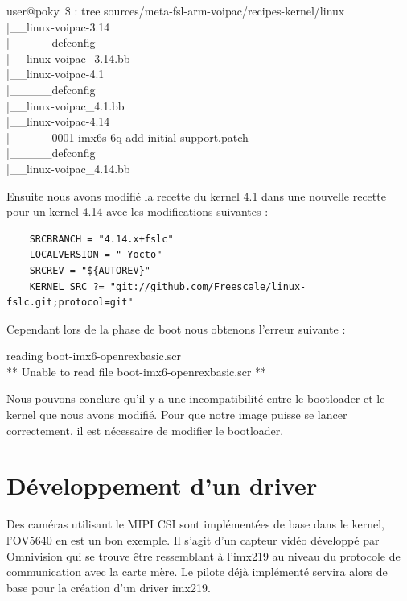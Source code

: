 {\begin{tcolorbox}
    user@poky~\$ : tree sources/meta-fsl-arm-voipac/recipes-kernel/linux \\
    |\_\_linux-voipac-3.14 \\
    |\_\_\_\_\_defconfig \\
    |\_\_linux-voipac\_3.14.bb \\
    |\_\_linux-voipac-4.1 \\
    |\_\_\_\_\_defconfig \\
    |\_\_linux-voipac\_4.1.bb \\
    |\_\_linux-voipac-4.14 \\
    |\_\_\_\_\_0001-imx6s-6q-add-initial-support.patch \\
    |\_\_\_\_\_defconfig \\
    |\_\_linux-voipac\_4.14.bb \\
\end{tcolorbox}

Ensuite nous avons modifié la recette du kernel 4.1 dans une nouvelle recette pour un
kernel 4.14 avec les modifications suivantes :

\begin{lstlisting}
    SRCBRANCH = "4.14.x+fslc"
    LOCALVERSION = "-Yocto"
    SRCREV = "${AUTOREV}"
    KERNEL_SRC ?= "git://github.com/Freescale/linux-fslc.git;protocol=git"
\end{lstlisting}

Cependant lors de la phase de boot nous obtenons l’erreur suivante :

\begin{tcolorbox}
    reading boot-imx6-openrexbasic.scr \\
    ** Unable to read file boot-imx6-openrexbasic.scr **
\end{tcolorbox}

Nous pouvons conclure qu’il y a une incompatibilité entre le bootloader et le kernel que
nous avons modifié. Pour que notre image puisse se lancer correctement, il est nécessaire
de modifier le bootloader.

\section{Développement d'un driver}

Des caméras utilisant le MIPI CSI sont implémentées de base dans le kernel, l’OV5640 en
est un bon exemple. Il s’agit d’un capteur vidéo développé par Omnivision qui se trouve
être ressemblant à l’imx219 au niveau du protocole de communication avec la carte mère.
Le pilote déjà implémenté servira alors de base pour la création d’un driver imx219.

}
